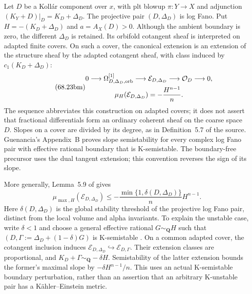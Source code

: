 Let $D$ be a Koll\'ar component over $x$, with plt blowup
$\pi:Y\to X$ and adjunction
$(K_Y+D)|_D=K_D+\Delta_D$. The projective pair $(D,\Delta_D)$ is
log Fano. Put $H=-(K_D+\Delta_D)$ and $a=A_X(D)>0$.
Although the ambient boundary is zero, the different $\Delta_D$
is retained. Its orbifold cotangent sheaf is interpreted on adapted
finite covers. On such a cover, the canonical extension is
an extension of the structure sheaf by the adapted cotangent sheaf,
with class induced by $c_1(K_D+\Delta_D)$:
\[
\tag{68.23bm}\label{eq:ytd-local-form-canonical-extension}
 \begin{gathered}
 0\longrightarrow\Omega^{[1]}_{D,\Delta_D,{\rm orb}}
  \longrightarrow{\mathcal E}_{D,\Delta_D}
  \longrightarrow{\mathcal O}_D\longrightarrow0,\\
 \mu_H({\mathcal E}_{D,\Delta_D})=-\frac{H^{n-1}}n.
 \end{gathered}
\]
The sequence abbreviates this construction on adapted covers;
it does not assert that fractional differentials form an ordinary
coherent sheaf on the coarse space $D$. Slopes on a cover are divided
by its degree, as in Definition~5.7 of the source.
Guenancia's Appendix~B proves slope semistability for every complex
log Fano pair with effective rational boundary that is K-semistable.
The boundary-free precursor \cite{DruelGuenanciaPaun24Published}
uses the dual tangent extension; this convention reverses the
sign of its slope.

More generally, Lemma~5.9 of \cite{XuZhuang26StableFormsV2} gives
\[
\tag{68.23bn}\label{eq:ytd-local-form-maximal-slope}
 \mu_{\max,H}({\mathcal E}_{D,\Delta_D})
 \leq-\frac{\min\{1,\delta(D,\Delta_D)\}}n H^{n-1}.
\]
Here $\delta(D,\Delta_D)$ is the global stability threshold of the
projective log Fano pair, distinct from the local volume and alpha
invariants. To explain the unstable case, write $\delta<1$ and
choose a general effective rational $G\sim_{\mathbf Q}H$ such that
$(D,\Gamma:=\Delta_D+(1-\delta)G)$ is K-semistable
\cite[Theorem~1.8]{LiuXuZhuang22ThresholdsPublished}.
On a common adapted cover, the cotangent inclusion induces
$\mathcal E_{D,\Delta_D}\hookrightarrow\mathcal E_{D,\Gamma}$.
Their extension classes are proportional, and
$K_D+\Gamma\sim_{\mathbf Q}-\delta H$.
Semistability of the latter extension bounds the former's maximal
slope by $-\delta H^{n-1}/n$. This uses an actual K-semistable
boundary perturbation, rather than an assertion that an arbitrary
K-unstable pair has a K\"ahler--Einstein metric.

